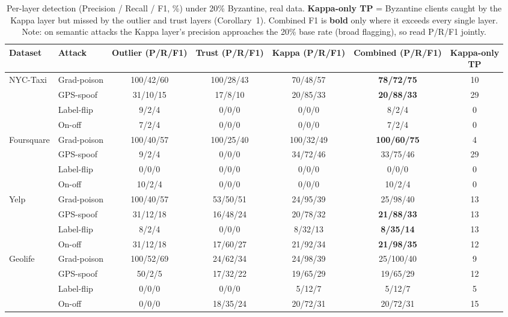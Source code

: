 \begin{table}[t]\centering\scriptsize
\caption{Per-layer detection (Precision / Recall / F1, \%) under 20\% Byzantine, real data. \textbf{Kappa-only TP} = Byzantine clients caught by the Kappa layer but missed by the outlier and trust layers (Corollary~1). Combined F1 is \textbf{bold} only where it exceeds every single layer. Note: on semantic attacks the Kappa layer's precision approaches the 20\% base rate (broad flagging), so read P/R/F1 jointly.}
\label{tab:layer_analysis}
\begin{tabular}{llccccc}
\toprule
Dataset & Attack & Outlier (P/R/F1) & Trust (P/R/F1) & Kappa (P/R/F1) & Combined (P/R/F1) & \shortstack{Kappa-only\\TP} \\
\midrule
NYC-Taxi & Grad-poison & 100/42/60 & 100/28/43 & 70/48/57 & \textbf{78/72/75} & 10 \\
 & GPS-spoof & 31/10/15 & 17/8/10 & 20/85/33 & \textbf{20/88/33} & 29 \\
 & Label-flip & 9/2/4 & 0/0/0 & 0/0/0 & 8/2/4 & 0 \\
 & On-off & 7/2/4 & 0/0/0 & 0/0/0 & 7/2/4 & 0 \\
\midrule
Foursquare & Grad-poison & 100/40/57 & 100/25/40 & 100/32/49 & \textbf{100/60/75} & 4 \\
 & GPS-spoof & 9/2/4 & 0/0/0 & 34/72/46 & 33/75/46 & 29 \\
 & Label-flip & 0/0/0 & 0/0/0 & 0/0/0 & 0/0/0 & 0 \\
 & On-off & 10/2/4 & 0/0/0 & 0/0/0 & 10/2/4 & 0 \\
\midrule
Yelp & Grad-poison & 100/40/57 & 53/50/51 & 24/95/39 & 25/98/40 & 13 \\
 & GPS-spoof & 31/12/18 & 16/48/24 & 20/78/32 & \textbf{21/88/33} & 13 \\
 & Label-flip & 8/2/4 & 0/0/0 & 8/32/13 & \textbf{8/35/14} & 13 \\
 & On-off & 31/12/18 & 17/60/27 & 21/92/34 & \textbf{21/98/35} & 12 \\
\midrule
Geolife & Grad-poison & 100/52/69 & 24/62/34 & 24/98/39 & 25/100/40 & 9 \\
 & GPS-spoof & 50/2/5 & 17/32/22 & 19/65/29 & 19/65/29 & 12 \\
 & Label-flip & 0/0/0 & 0/0/0 & 5/12/7 & 5/12/7 & 5 \\
 & On-off & 0/0/0 & 18/35/24 & 20/72/31 & 20/72/31 & 15 \\
\bottomrule
\end{tabular}
\end{table}
